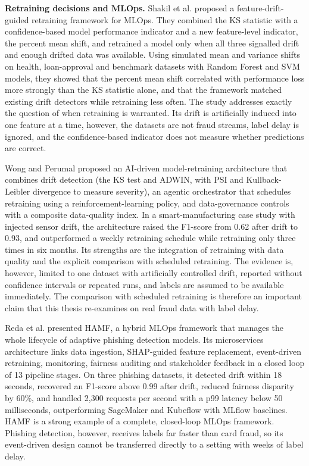 \textbf{Retraining decisions and MLOps.} Shakil et al. \cite{shakil2025} proposed a feature-drift-guided retraining framework for MLOps. They combined the KS statistic with a confidence-based model performance indicator and a new feature-level indicator, the percent mean shift, and retrained a model only when all three signalled drift and enough drifted data was available. Using simulated mean and variance shifts on health, loan-approval and benchmark datasets with Random Forest and SVM models, they showed that the percent mean shift correlated with performance loss more strongly than the KS statistic alone, and that the framework matched existing drift detectors while retraining less often. The study addresses exactly the question of when retraining is warranted. Its drift is artificially induced into one feature at a time, however, the datasets are not fraud streams, label delay is ignored, and the confidence-based indicator does not measure whether predictions are correct.

Wong and Perumal \cite{wong2025} proposed an AI-driven model-retraining architecture that combines drift detection (the KS test and ADWIN, with PSI and Kullback-Leibler divergence to measure severity), an agentic orchestrator that schedules retraining using a reinforcement-learning policy, and data-governance controls with a composite data-quality index. In a smart-manufacturing case study with injected sensor drift, the architecture raised the F1-score from 0.62 after drift to 0.93, and outperformed a weekly retraining schedule while retraining only three times in six months. Its strengths are the integration of retraining with data quality and the explicit comparison with scheduled retraining. The evidence is, however, limited to one dataset with artificially controlled drift, reported without confidence intervals or repeated runs, and labels are assumed to be available immediately. The comparison with scheduled retraining is therefore an important claim that this thesis re-examines on real fraud data with label delay.

Reda et al. \cite{reda2025} presented HAMF, a hybrid MLOps framework that manages the whole lifecycle of adaptive phishing detection models. Its microservices architecture links data ingestion, SHAP-guided feature replacement, event-driven retraining, monitoring, fairness auditing and stakeholder feedback in a closed loop of 13 pipeline stages. On three phishing datasets, it detected drift within 18 seconds, recovered an F1-score above 0.99 after drift, reduced fairness disparity by 60\%, and handled 2,300 requests per second with a p99 latency below 50 milliseconds, outperforming SageMaker and Kubeflow with MLflow baselines. HAMF is a strong example of a complete, closed-loop MLOps framework. Phishing detection, however, receives labels far faster than card fraud, so its event-driven design cannot be transferred directly to a setting with weeks of label delay.

